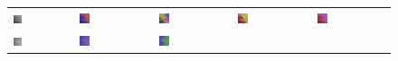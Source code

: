 \begin{figure}[h!]
\begin{tabular}{C{0.19\textwidth}C{0.19\textwidth}C{0.19\textwidth}C{0.19\textwidth}C{0.19\textwidth}}
		\includegraphics[width=0.15\textwidth]{images/p03/p03_02.png} &
		\includegraphics[width=0.15\textwidth]{images/gen/activation_functions/p03_02.png_None.png} &
		\includegraphics[width=0.15\textwidth]{images/gen/activation_functions/p03_02.png_relu.png} &
		\includegraphics[width=0.15\textwidth]{images/gen/activation_functions/p03_02.png_sigmoid.png} &
		\includegraphics[width=0.15\textwidth]{images/gen/activation_functions/p03_02.png_tanh.png} \\
		\includegraphics[width=0.15\textwidth]{images/p03/p03_03.png} &
		\includegraphics[width=0.15\textwidth]{images/gen/activation_functions/p03_03.png_None.png} &
		\includegraphics[width=0.15\textwidth]{images/gen/activation_functions/p03_03.png_relu.png} &

\end{tabular}
\end{figure}
